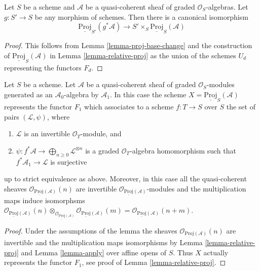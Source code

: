 \begin{lemma}
\label{lemma-relative-proj-base-change}
Let $S$ be a scheme and $\mathcal{A}$ be a quasi-coherent sheaf
of graded $\mathcal{O}_S$-algebras. Let $g : S' \to S$ be any morphism
of schemes. Then there is a canonical isomorphism
$$
\underline{\text{Proj}}_{S'}(g^*\mathcal{A})
\longrightarrow
S' \times_S \underline{\text{Proj}}_S(\mathcal{A})
$$
\end{lemma}

\begin{proof}
This follows from Lemma \ref{lemma-proj-base-change} and the construction
of $\underline{\text{Proj}}_S(\mathcal{A})$ in
Lemma \ref{lemma-relative-proj} as the union
of the schemes $U_d$ representing the functors $F_d$.
\end{proof}

\begin{lemma}
\label{lemma-apply-relative}
Let $S$ be a scheme.
Let $\mathcal{A}$ be a quasi-coherent sheaf of graded $\mathcal{O}_S$-modules
generated as an $\mathcal{A}_0$-algebra by $\mathcal{A}_1$.
In this case the scheme $X = \underline{\text{Proj}}_S(\mathcal{A})$
represents the functor $F_1$ which associates to a scheme
$f : T \to S$ over $S$ the set of pairs $(\mathcal{L}, \psi)$, where
\begin{enumerate}
\item $\mathcal{L}$ is an invertible $\mathcal{O}_T$-module, and
\item $\psi : f^*\mathcal{A} \to \bigoplus_{n \geq 0} \mathcal{L}^{\otimes n}$
is a graded $\mathcal{O}_T$-algebra homomorphism such that
$f^*\mathcal{A}_1 \to \mathcal{L}$ is surjective
\end{enumerate}
up to strict equivalence as above. Moreover, in this case all the
quasi-coherent sheaves
$\mathcal{O}_{\underline{\text{Proj}}(\mathcal{A})}(n)$
are invertible
$\mathcal{O}_{\underline{\text{Proj}}(\mathcal{A})}$-modules
and the multiplication maps induce isomorphsms
$
\mathcal{O}_{\underline{\text{Proj}}(\mathcal{A})}(n)
\otimes_{\mathcal{O}_{\underline{\text{Proj}}(\mathcal{A})}}
\mathcal{O}_{\underline{\text{Proj}}(\mathcal{A})}(m) =
\mathcal{O}_{\underline{\text{Proj}}(\mathcal{A})}(n + m)$.
\end{lemma}

\begin{proof}
Under the assumptions of the lemma the sheaves
$\mathcal{O}_{\underline{\text{Proj}}(\mathcal{A})}(n)$
are invertible and the multiplication maps isomorphisms
by Lemma \ref{lemma-relative-proj} and
Lemma \ref{lemma-apply}
over affine opens of $S$. Thus $X$ actually represents the
functor $F_1$, see proof of Lemma \ref{lemma-relative-proj}.
\end{proof}












